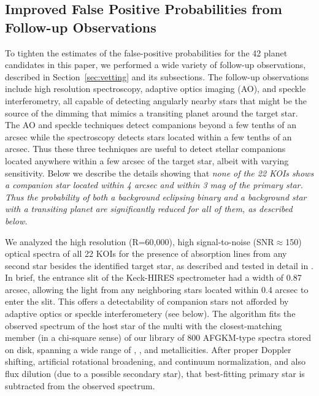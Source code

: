 \documentclass{emulateapj}
\begin{document}
 \subsection{Improved False Positive Probabilities from Follow-up Observations}
 \label{sec:fpp2}
 
 To tighten the estimates of the false-positive probabilities for the
 42 planet candidates in this paper, we performed a wide variety of
 follow-up observations, described in Section~\ref{sec:vetting} and
 its subsections.  The follow-up observations include high resolution
 spectroscopy, adaptive optics imaging (AO), and speckle
 interferometry, all capable of detecting angularly nearby stars that
 might be the source of the dimming that mimics a transiting planet
 around the target star.  The AO and speckle techniques detect
 companions beyond a few tenths of an arcsec while the spectroscopy
 detects stars located within a few tenths of an arcsec.  Thus these
 three techniques are useful to detect stellar companions located
 anywhere within a few arcsec of the target star, albeit with varying
 sensitivity.  Below we describe the details showing that {\em none of
 the 22 KOIs shows a companion star located within 4 arcsec and within
 3 mag of the primary star.  Thus the probability of both a background
 eclipsing binary and a background star with a transiting planet are
 significantly reduced for all of them, as described below.}

We analyzed the high resolution (R=60,000), high signal-to-noise
 (SNR$\approx$150) optical spectra of all 22 KOIs for the presence of
 absorption lines from any second star besides the identified \ek
 target star, as described and tested in detail in \cite{Kolbl2013}.
  In brief, the entrance slit of the Keck-HIRES spectrometer had a
 width of 0.87 arcsec, allowing the light from any neighboring stars
 located within 0.4 arcsec to enter the slit.  This offers a
 detectability of companion stars not afforded by adaptive optics or
 speckle interferometery (see below).  The algorithm fits the observed
 spectrum of the host star of the multi with the closest-matching
 member (in a chi-square sense) of our library of 800 AFGKM-type
 spectra stored on disk, spanning a wide range of \teff, \logg, and
 metallicities.  After proper Doppler shifting, artificial rotational
 broadening, and continuum normalization, and also flux dilution (due
 to a possible secondary star), that best-fitting primary star is
 subtracted from the observed spectrum.
\end{document}
